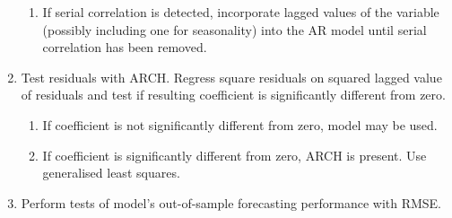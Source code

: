 \begin{definition}
\begin{enumerate}[label=\roman*.]
\begin{enumerate}[label=\arabic*.]
\item If serial correlation is detected, incorporate lagged values of the variable (possibly including one for seasonality) into the AR model until serial correlation has been removed.
\end{enumerate}
\item Test residuals with ARCH. Regress square residuals on squared lagged value of residuals and test if resulting coefficient is significantly different from zero.
\begin{enumerate}[label=\arabic*.]
\setlength{\itemsep}{0pt}
\item If coefficient is not significantly different from zero, model may be used.
\item If coefficient is significantly different from zero, ARCH is present. Use generalised least squares.
\end{enumerate}
\item Perform tests of model’s out-of-sample forecasting performance with RMSE.
\end{enumerate}
\end{definition}
